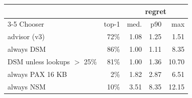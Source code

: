 \begin{tabular}{lrrrr}
\toprule
 & & \multicolumn{3}{c}{regret} \\
\cmidrule(lr){3-5}
Chooser & top-1 & med. & p90 & max \\
\midrule
advisor (v3) & 72\% & 1.08 & 1.25 & 1.51 \\
always DSM & 86\% & 1.00 & 1.11 & 8.35 \\
DSM unless lookups $>$ 25\% & 81\% & 1.00 & 1.36 & 10.70 \\
always PAX 16 KB & 2\% & 1.82 & 2.87 & 6.51 \\
always NSM & 10\% & 3.51 & 8.35 & 12.15 \\
\bottomrule
\end{tabular}
